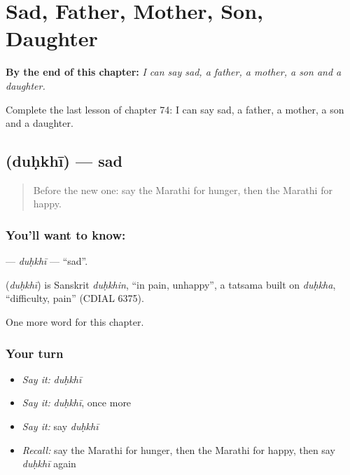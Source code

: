 
\chapter{Sad, Father, Mother, Son, Daughter}
\label{ch:mr-sad-father-mother-son-daughter}

\begin{chapteropening}
\textbf{By the end of this chapter:} \emph{I can say sad, a father, a mother, a son and a daughter.}

Complete the last lesson of chapter 74: I can say sad, a father, a mother, a son and a daughter.
\end{chapteropening}

\section[\texorpdfstring{\mr{दुःखी} (duḥkhī)}{दुःखी (duḥkhī)}]{ (duḥkhī) — sad}

\label{lesson:MR-C74-duhkhi}



\begin{quote}
Before the new one: say the Marathi for hunger, then the Marathi for happy.
\end{quote}

\subsection*{You'll want to know: }
\textbf{} — \emph{duḥkhī} — \textquotedblleft{}sad\textquotedblright{}.

\begin{cousinweb}
\textbf{} (\emph{duḥkhī}) is Sanskrit \emph{duḥkhin}, \textquotedblleft{}in pain, unhappy\textquotedblright{}, a tatsama built on \emph{duḥkha}, \textquotedblleft{}difficulty, pain\textquotedblright{} (CDIAL 6375).
\end{cousinweb}

\begin{grammarlens}[title={What you've built}]
One more word for this chapter.
\end{grammarlens}

\subsection*{Your turn}
\begin{itemize}
\raggedright
  \item \emph{Say it:} \emph{duḥkhī}
  \item \emph{Say it:} \emph{duḥkhī}, once more
  \item \emph{Say it:} say \emph{duḥkhī}
  \item \emph{Recall:} say the Marathi for hunger, then the Marathi for happy, then say \emph{duḥkhī} again
\end{itemize}

